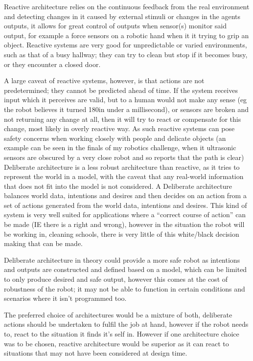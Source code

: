 \documentclass[10pt]{article}
\begin{document}
    Reactive architecture relies on the continuous feedback from the real environment and detecting changes in it caused by external stimuli or changes in the agents outputs, it allows for great control of outputs when sensor(s) monitor said output, for example a force sensors on a robotic hand when it it trying to grip an object. Reactive systems are very good for unpredictable or varied environments, such as that of a busy hallway; they can try to clean but stop if it becomes busy, or they encounter a closed door. 

    A large caveat of reactive systems, however, is that actions are not predetermined; they cannot be predicted ahead of time. If the system receives input which it perceives are valid, but to a human would not make any sense (eg the robot believes it turned 180\textdegree in under a millisecond), or sensors are broken and not returning any change at all, then it will try to react or compensate for this change, most likely in overly reactive way. As such reactive systems can pose safety concerns when working closely with people and delicate objects (an example can be seen in the finals of my robotics challenge, when it ultrasonic sensors are obscured by a very close robot and so reports that the path is clear)\\

    Deliberate architecture is a less robust architecture than reactive, as it tries to represent the world in a model, with the caveat that any real-world information that does not fit into the model is not considered. A Deliberate architecture balances world data, intentions and desires and then decides on an action from a set of actions generated from the world data, intentions and desires. This kind of system is very well suited for applications where a ``correct course of action'' can be made (IE there is a right and wrong), however in the situation the robot will be working in, cleaning schools, there is very little of this white/black decision making that can be made. 

    Deliberate architecture in theory could provide a more safe robot as intentions and outputs are constructed and defined based on a model, which can be limited to only produce desired and safe output, however this comes at the cost of robustness of the robot; it may not be able to function in certain conditions and scenarios where it isn't programmed too. 

    The preferred choice of architectures would be a mixture of both, deliberate actions should be undertaken to fulfil the job at hand, however if the robot needs to, react to the situation it finds it's self in. However if one architecture choice was to be chosen, reactive architecture would be superior as it can react to situations that may not have been considered at design time.
\end{document}
